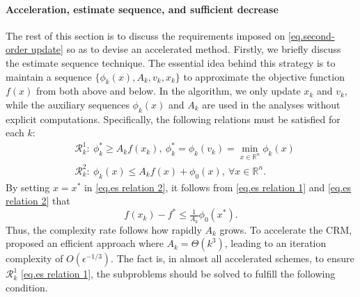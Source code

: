 \documentclass{article}
\theoremstyle{plain}
\theoremstyle{definition}
\theoremstyle{remark}
\begin{document}
\paragraph{Acceleration, estimate sequence, and sufficient decrease}

The rest of this section is to discuss the requirements imposed on \eqref{eq.second-order update} so as to devise an accelerated method.
Firstly, we briefly discuss the estimate sequence technique. The essential idea behind this strategy is to maintain a sequence $\{\phi_k(x),A_k,v_k,x_k\}$ to approximate the objective function $f(x)$ from both above and below. In the algorithm, we only update $x_k$ and $v_k$, while the auxiliary sequences $\phi_k(x)$ and $A_k$ are used in the analyses without explicit computations. Specifically, the following relations must be satisfied for each $k$:
\begin{subequations}\label{eq.es relation}
    \begin{align}
        \label{eq.es relation 1}
         & \mathcal{R}_k^1: \ \phi_k^*  \geq A_k f(x_k), \  \phi_k^*= \phi_k(v_k) =\min_{x\in\mathbb{R}^n}\phi_k(x) \\
        \label{eq.es relation 2}
         & \mathcal{R}_k^2: \ \phi_k(x)\leq A_kf(x)+\phi_0(x), \ \forall x\in\mathbb{R}^n.
    \end{align}
\end{subequations}
By setting $x = x^*$ in \eqref{eq.es relation 2}, it follows from \eqref{eq.es relation 1} and \eqref{eq.es relation 2} that
\begin{equation*}
    f(x_k)-f^* \leq \tfrac{1}{A_k}\phi_0(x^*).
\end{equation*}
Thus, the complexity rate follows how rapidly $A_k$ grows. To accelerate the CRM, \citet{nesterov2008accelerating} proposed an efficient approach where $A_k=\Theta(k^3)$, leading to an iteration complexity of $O(\epsilon^{-1/3})$. The fact is, in almost all accelerated schemes, to ensure $\mathcal{R}_k^1$ \eqref{eq.es relation 1}, the subproblems should be solved to fulfill the following condition.
\end{document}
